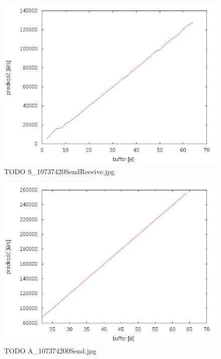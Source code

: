 \documentclass{BscUS}
\begin{document}
\begin{figure}[h]
\centering
\includegraphics{./img/S_10737420SendReceive}
\caption{TODO S\_10737420SendReceive.jpg}
\end{figure}


\begin{figure}[h]
\centering
\includegraphics{./img/A_107374200Send}
\caption{TODO A\_107374200Send.jpg}
\end{figure}
\end{document}
